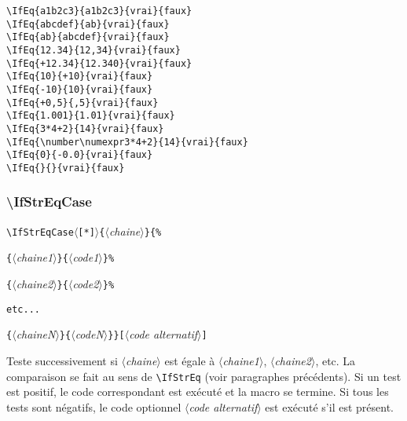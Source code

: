 \documentclass[a4paper,10pt]{article}
\newcommand\argu[1]{$\langle$\textit{#1}$\rangle$}
\newcommand\ARGU[1]{\texttt{\color{black}\{}\argu{#1}\texttt{\color{black}\}}}
\newcommand\arguC[1]{\texttt{\color{black}[}\argu{#1}\texttt{\color{black}]}}
\newcommand\etoile{$\langle$\texttt{[*]}$\rangle$}
\newcommand\styleexemple{\small\vskip4pt}
\newcommand\verbinline{\lstinline[basicstyle=\normalsize\ttfamily]}
\begin{document}
\begin{minipage}[t]{0.65\linewidth}
\begin{lstlisting}
\IfEq{a1b2c3}{a1b2c3}{vrai}{faux}
\IfEq{abcdef}{ab}{vrai}{faux}
\IfEq{ab}{abcdef}{vrai}{faux}
\IfEq{12.34}{12,34}{vrai}{faux}
\IfEq{+12.34}{12.340}{vrai}{faux}
\IfEq{10}{+10}{vrai}{faux}
\IfEq{-10}{10}{vrai}{faux}
\IfEq{+0,5}{,5}{vrai}{faux}
\IfEq{1.001}{1.01}{vrai}{faux}
\IfEq{3*4+2}{14}{vrai}{faux}
\IfEq{\number\numexpr3*4+2}{14}{vrai}{faux}
\IfEq{0}{-0.0}{vrai}{faux}
\IfEq{}{}{vrai}{faux}
\end{lstlisting}%
\end{minipage}\hfill
\begin{minipage}[t]{0.35\linewidth}
	\styleexemple
	\par
	\par
	\par
	\par
	\par
	\par
	\par
	\par
	\par
	\par
	\par
	\par
\end{minipage}%

\subsubsection{\ttfamily\textbackslash IfStrEqCase}
\begin{minipage}{\textwidth}
	\verbinline|\IfStrEqCase|\etoile\ARGU{chaine}\verb|{%|\par
	\qquad\qquad\ARGU{chaine1}\ARGU{code1}\verb|%|\par
	\qquad\qquad\ARGU{chaine2}\ARGU{code2}\verb|%|\par
	\qquad\qquad\verb|etc...|\par
	\qquad\qquad\ARGU{chaineN}\ARGU{codeN}\verb|}|\arguC{code alternatif}
\end{minipage}
\smallskip

Teste successivement si \argu{chaine} est égale à \argu{chaine1}, \argu{chaine2}, etc. La comparaison se fait au sens de \verbinline|\IfStrEq| (voir paragraphes précédents). Si un test est positif, le code correspondant est exécuté et la macro se termine. Si tous les tests sont négatifs, le code optionnel \argu{code alternatif} est exécuté s'il est présent.\smallskip
\end{document}

